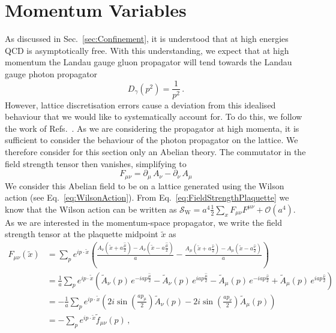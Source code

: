 \section{Momentum Variables}\label{sec:MomentumVariables}
As discussed in Sec.~\ref{sec:Confinement}, it is understood that at high energies QCD is asymptotically free. With this understanding, we expect that at high momentum the Landau gauge gluon propagator will tend towards the Landau gauge photon propagator~\cite{ryder1996quantum}
%
\begin{equation}
D_\gamma(p^2) = \frac{1}{p^2}\, .
\end{equation}
%
However, lattice discretisation errors cause a deviation from this idealised behaviour that we would like to systematically account for. To do this, we follow the work of Refs.~\cite{Weisz:1982zw, Weisz:1983bn,Luscher:1985zq,Symanzik:1983dc,Symanzik:1983gh}. As we are considering the propagator at high momenta, it is sufficient to consider the behaviour of the photon propagator on the lattice. We therefore consider for this section only an Abelian theory. The commutator in the field strength tensor then vanishes, simplifying to
%
\begin{equation}
F_{\mu\nu} = \partial_\mu \,A_\nu - \partial_\nu\,A_\mu
\end{equation}
%
We consider this Abelian field to be on a lattice generated using the Wilson action (see Eq.~\eqref{eq:WilsonAction}). From Eq.~\eqref{eq:FieldStrengthPlaquette} we know that the Wilson action can be written as $\mathcal{S}_\text{W} = a^4\frac{1}{2}\sum_x F_{\mu\nu}F^{\mu\nu} + \mathcal{O}(a^4)$. As we are interested in the momentum-space propagator, we write the field strength tensor at the plaquette midpoint $\tilde{x}$ as
%
\begin{align*}
F_{\mu\nu}(\tilde{x}) &= \sum_p e^{ip\cdot\tilde{x}} \left(\frac{A_\nu\left(\tilde{x}+a\frac{\hat{\mu}}{2}\right) - A_\nu\left(\tilde{x}-a\frac{\hat{\mu}}{2} \right)}{a} - \frac{A_\mu\left(\tilde{x}+a\frac{\hat{\nu}}{2}\right) - A_\mu\left(\tilde{x}-a\frac{\hat{\nu}}{2} \right)}{a}\right)\\
&= \frac{1}{a} \sum_p e^{ip\cdot\tilde{x}} \left(\tilde{A}_\nu(p)\, e^{-iap\frac{\hat{\mu}}{2}} - \tilde{A}_\nu(p)\, e^{iap\frac{\hat{\mu}}{2}} - \tilde{A}_\mu(p)\, e^{-iap\frac{\hat{\nu}}{2}} + \tilde{A}_\mu(p)\, e^{iap\frac{\hat{\nu}}{2}}\right)\\
&= -\frac{1}{a} \sum_p e^{ip\cdot\tilde{x}}\left(2i\sin\left(\frac{a p_\mu}{2}\right)\tilde{A}_\nu(p) - 2i\sin\left(\frac{a p_\nu}{2}\right)\tilde{A}_\mu(p)\right)\\
&= - \sum_p e^{ip\cdot\tilde{x}}\tilde{f}_{\mu\nu}(p)\, ,
\end{align*}
